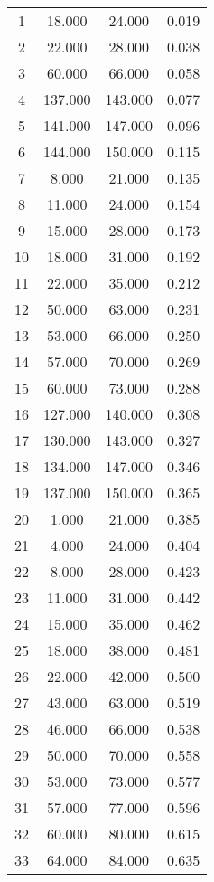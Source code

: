 % 
\begin{tabular}{cccc}
  \hline
  \hline
1 & 18.000 & 24.000 & 0.019 \\ 
  2 & 22.000 & 28.000 & 0.038 \\ 
  3 & 60.000 & 66.000 & 0.058 \\ 
  4 & 137.000 & 143.000 & 0.077 \\ 
  5 & 141.000 & 147.000 & 0.096 \\ 
  6 & 144.000 & 150.000 & 0.115 \\ 
  7 & 8.000 & 21.000 & 0.135 \\ 
  8 & 11.000 & 24.000 & 0.154 \\ 
  9 & 15.000 & 28.000 & 0.173 \\ 
  10 & 18.000 & 31.000 & 0.192 \\ 
  11 & 22.000 & 35.000 & 0.212 \\ 
  12 & 50.000 & 63.000 & 0.231 \\ 
  13 & 53.000 & 66.000 & 0.250 \\ 
  14 & 57.000 & 70.000 & 0.269 \\ 
  15 & 60.000 & 73.000 & 0.288 \\ 
  16 & 127.000 & 140.000 & 0.308 \\ 
  17 & 130.000 & 143.000 & 0.327 \\ 
  18 & 134.000 & 147.000 & 0.346 \\ 
  19 & 137.000 & 150.000 & 0.365 \\ 
  20 & 1.000 & 21.000 & 0.385 \\ 
  21 & 4.000 & 24.000 & 0.404 \\ 
  22 & 8.000 & 28.000 & 0.423 \\ 
  23 & 11.000 & 31.000 & 0.442 \\ 
  24 & 15.000 & 35.000 & 0.462 \\ 
  25 & 18.000 & 38.000 & 0.481 \\ 
  26 & 22.000 & 42.000 & 0.500 \\ 
  27 & 43.000 & 63.000 & 0.519 \\ 
  28 & 46.000 & 66.000 & 0.538 \\ 
  29 & 50.000 & 70.000 & 0.558 \\ 
  30 & 53.000 & 73.000 & 0.577 \\ 
  31 & 57.000 & 77.000 & 0.596 \\ 
  32 & 60.000 & 80.000 & 0.615 \\ 
  33 & 64.000 & 84.000 & 0.635 \\ 

\end{tabular}
